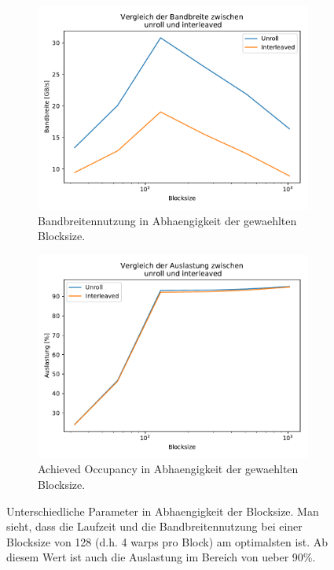 \documentclass[10pt,a4paper]{article}
\begin{document}
\begin{figure}[H]
  \begin{subfigure}{.5\textwidth}
    \centering
    \includegraphics[width=\textwidth]{../figures/bw_blocksize.pdf}
    \caption{Bandbreitennutzung in Abhaengigkeit der gewaehlten Blocksize.}
  \end{subfigure}
  \begin{subfigure}{.5\textwidth}
    \centering
    \includegraphics[width=\textwidth]{../figures/occ_blocksize.pdf}
    \caption{Achieved Occupancy in Abhaengigkeit der gewaehlten Blocksize.}
  \end{subfigure}

  \caption{Unterschiedliche Parameter in Abhaengigkeit der Blocksize. Man sieht,
  dass die Laufzeit und die Bandbreitennutzung bei einer Blocksize von 128 (d.h.
  4 warps pro Block) am optimalsten ist. Ab diesem Wert ist auch die Auslastung
  im Bereich von ueber 90\%.}
  \label{fig:blocksizes}
\end{figure}
\end{document}

